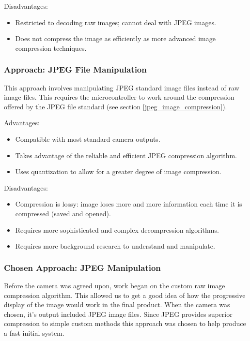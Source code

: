Disadvantages:
\begin{itemize}
	\item Restricted to decoding raw images; 
		cannot deal with JPEG images.
	\item Does not compress the image as 
		efficiently as more advanced 
		image compression techniques.
\end{itemize}

\subsubsection{Approach: JPEG File Manipulation}

This approach involves manipulating JPEG standard image 
files instead of raw image files. This requires the
microcontroller to work around the compression offered
by the JPEG file standard (see section \ref{jpeg_image_compression}).

Advantages:
\begin{itemize}
	\item Compatible with most standard
		camera outputs.
	\item Takes advantage of the reliable and
		efficient JPEG compression algorithm.
	\item Uses quantization to allow for a greater
		degree of image compression.
\end{itemize}

Disadvantages:
\begin{itemize}
	\item Compression is lossy: image loses 
		more and more information 
		each time it is compressed 
		(saved and opened).
	\item Requires more sophisticated and complex
		decompression algorithms.
	\item Requires more background research to
		understand and manipulate.
\end{itemize}

\subsubsection{Chosen Approach: JPEG Manipulation}

Before the camera was agreed upon, work began on the
custom raw image compression algorithm. This
allowed us to get a good idea of how the progressive
display of the image would work in the final product.
When the camera was chosen, it's output
included JPEG image files. Since JPEG provides
superior compression to simple custom methods 
this approach was chosen to help produce a fast initial system.

